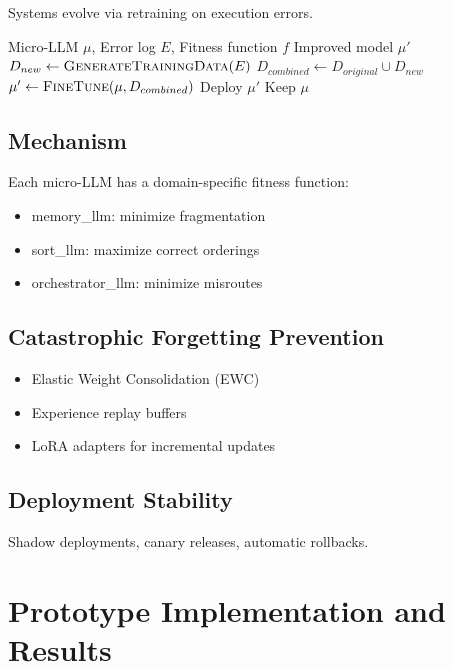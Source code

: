 \documentclass[11pt,a4paper]{article}
\begin{document}
Systems evolve via retraining on execution errors.

\begin{algorithm}
\caption{Darwinian Retraining}
\label{alg:retrain}
\begin{algorithmic}[1]
\Require Micro-LLM $\mu$, Error log $E$, Fitness function $f$
\Ensure Improved model $\mu'$
\State $D_{new} \gets \textsc{GenerateTrainingData}(E)$ 
\State $D_{combined} \gets D_{original} \cup D_{new}$
\State $\mu' \gets \textsc{FineTune}(\mu, D_{combined})$
    \State Deploy $\mu'$ 
\Else
    \State Keep $\mu$ 
\EndIf
\end{algorithmic}
\end{algorithm}

\subsection{Mechanism}

Each micro-LLM has a domain-specific fitness function:
\begin{itemize}
    \item memory\_llm: minimize fragmentation
    \item sort\_llm: maximize correct orderings
    \item orchestrator\_llm: minimize misroutes
\end{itemize}

\subsection{Catastrophic Forgetting Prevention}

\begin{itemize}
    \item Elastic Weight Consolidation (EWC)
    \item Experience replay buffers
    \item LoRA adapters for incremental updates
\end{itemize}

\subsection{Deployment Stability}

Shadow deployments, canary releases, automatic rollbacks.

\section{Prototype Implementation and Results}
\label{sec:prototype}
\end{document}
